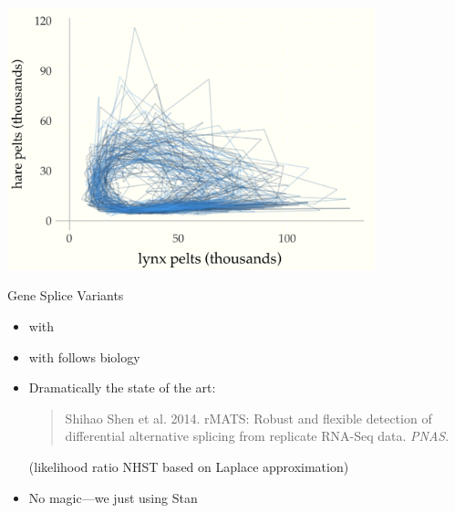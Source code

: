 \documentclass[10pt]{report}
\begin{document}
\begin{center}
\includegraphics[width=0.8\textwidth]{img/lotka-volterra-posterior-time.png}
\end{center}

       {Gene Splice Variants}

\begin{itemize}
\item {} with
\item {} with  follows biology
\item Dramatically  the state of the art:
\begin{quote}
\small Shihao Shen et al. 2014. rMATS: Robust and flexible detection of
differential alternative splicing from replicate RNA-Seq data.
{\slshape PNAS}.
\end{quote}
{\small (likelihood ratio NHST based on Laplace approximation)}
\item No magic---we just  using Stan
\end{itemize}
\end{document}
